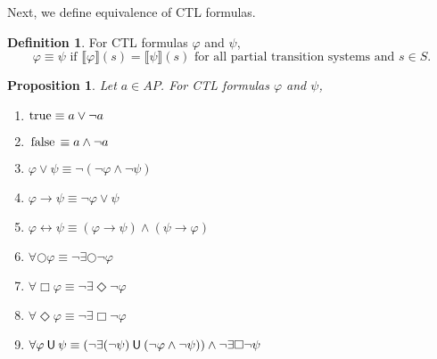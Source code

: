 \documentclass[12pt]{article}
\newcommand{\always}{\Box}
\newcommand{\eventually}{\Diamond}
\newcommand{\nxt}{\bigcirc}
\newcommand{\until}{\mathbin{\sf U}}
\newcommand{\TRUE}{\mbox{\lstinline{true}}}
\newcommand{\FALSE}{\mbox{\lstinline{false}}}
\newtheorem{proposition}{Proposition}
\theoremstyle{definition}
\newtheorem{definition}{Definition}
\newcommand{\satisfaction}[1]{\llbracket #1 \rrbracket}
\newenvironment{franck}{\color{red}}{\color{black}}
\begin{document}
Next, we define equivalence of CTL formulas.

\begin{definition}
For CTL formulas $\varphi$ and $\psi$, 
\[
\varphi \equiv \psi \mbox{ if } \satisfaction{\varphi}(s) = \satisfaction{\psi}(s) \mbox{ for all partial transition systems and } s \in S.
\]
\end{definition}

\begin{proposition}
Let $a \in \mathit{AP}$.  For CTL formulas $\varphi$ and $\psi$, 
\begin{enumerate}
\item 
$\TRUE \equiv a \vee \neg a$
\item 
$\FALSE \equiv a \wedge \neg a$
\item
$\varphi \vee \psi \equiv \neg(\neg \varphi \wedge \neg \psi)$
\item
$\varphi \rightarrow \psi \equiv \neg \varphi \vee \psi$
\item
$\varphi \leftrightarrow \psi \equiv (\varphi \rightarrow \psi) \wedge (\psi \rightarrow \varphi)$
\item
$\forall \nxt \varphi \equiv \neg \exists \nxt \neg \varphi$
\item
$\forall \always \varphi \equiv \neg \exists \eventually \neg \varphi$
\item
$\forall \eventually \varphi \equiv \neg \exists \always \neg \varphi$
\item
\begin{franck}
$\forall \varphi \until \psi \equiv (\neg \exists (\neg \psi) \until (\neg \varphi \wedge \neg \psi)) \wedge \neg \exists \always \neg \psi$
\end{franck}
\end{enumerate}
\end{proposition}
\end{document}

